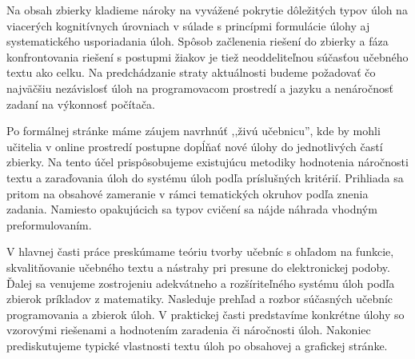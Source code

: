 Na obsah zbierky kladieme nároky na vyvážené pokrytie dôležitých typov úloh na viacerých kognitívnych úrovniach v súlade s princípmi formulácie úlohy aj systematického usporiadania úloh. Spôsob začlenenia riešení do zbierky a fáza konfrontovania riešení s postupmi žiakov je tiež neoddeliteľnou súčasťou učebného textu ako celku. Na predchádzanie straty aktuálnosti budeme požadovať čo najväčšiu nezávislosť úloh na programovacom prostredí a jazyku a nenáročnosť zadaní na výkonnosť počítača. 

Po formálnej stránke máme záujem navrhnúť ,,živú učebnicu'', kde by mohli učitelia v online prostredí postupne dopĺňať nové úlohy do jednotlivých častí zbierky. Na tento účel prispôsobujeme existujúcu metodiky hodnotenia náročnosti textu a zaraďovania úloh do systému úloh podľa príslušných kritérií. Prihliada sa pritom na obsahové zameranie v rámci tematických okruhov podľa znenia zadania. Namiesto opakujúcich sa typov cvičení sa nájde náhrada vhodným preformulovaním.

V hlavnej časti práce preskúmame teóriu tvorby učebníc s ohľadom na funkcie, skvalitňovanie učebného textu a nástrahy pri presune do elektronickej podoby. Ďalej sa venujeme zostrojeniu adekvátneho a rozšíriteľného systému úloh podľa zbierok príkladov z matematiky. Nasleduje   prehľad a rozbor súčasných učebníc programovania a zbierok úloh. V praktickej časti predstavíme konkrétne úlohy so vzorovými riešenami a hodnotením zaradenia či náročnosti úloh. Nakoniec prediskutujeme typické vlastnosti textu úloh po obsahovej a grafickej stránke.